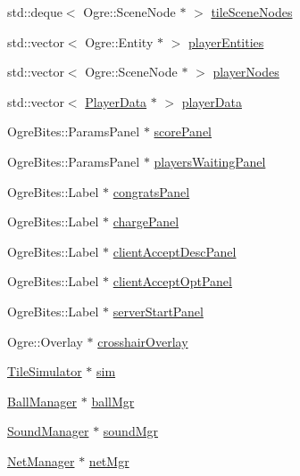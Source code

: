 \begin{DoxyCompactItemize}
\item 
std\-::deque$<$ Ogre\-::\-Scene\-Node $\ast$ $>$ \hyperlink{classTileGame_ac8b228c7849cb924a099f94de266c42d}{tile\-Scene\-Nodes}
\item 
std\-::vector$<$ Ogre\-::\-Entity $\ast$ $>$ \hyperlink{classTileGame_a30a9864bb733707d17c15b2c09a6245a}{player\-Entities}
\item 
std\-::vector$<$ Ogre\-::\-Scene\-Node $\ast$ $>$ \hyperlink{classTileGame_ab261f06fa3d89f8af2223ffe1a56337a}{player\-Nodes}
\item 
std\-::vector$<$ \hyperlink{structPlayerData}{Player\-Data} $\ast$ $>$ \hyperlink{classTileGame_adc02f822e33b2d8a77693301d050bb91}{player\-Data}
\item 
Ogre\-Bites\-::\-Params\-Panel $\ast$ \hyperlink{classTileGame_a9a4d1b4dfacca55fdeacf454af04fa0c}{score\-Panel}
\item 
Ogre\-Bites\-::\-Params\-Panel $\ast$ \hyperlink{classTileGame_a6ec622cd0062396ffa3e929702fc870d}{players\-Waiting\-Panel}
\item 
Ogre\-Bites\-::\-Label $\ast$ \hyperlink{classTileGame_a5e8deb9eb2903e1787a28699a9e6f346}{congrats\-Panel}
\item 
Ogre\-Bites\-::\-Label $\ast$ \hyperlink{classTileGame_ab63beac85c1df6056bd1a097e43cea34}{charge\-Panel}
\item 
Ogre\-Bites\-::\-Label $\ast$ \hyperlink{classTileGame_a0b1acda06716401a6a6a1936d111e187}{client\-Accept\-Desc\-Panel}
\item 
Ogre\-Bites\-::\-Label $\ast$ \hyperlink{classTileGame_ab768d0250251800d81ff2d85d1c2c324}{client\-Accept\-Opt\-Panel}
\item 
Ogre\-Bites\-::\-Label $\ast$ \hyperlink{classTileGame_a788abd4a926b8492ba5db8f4d87a41a7}{server\-Start\-Panel}
\item 
Ogre\-::\-Overlay $\ast$ \hyperlink{classTileGame_a11747d7250c1ef16b13a14a84edbfbaf}{crosshair\-Overlay}
\item 
\hyperlink{classTileSimulator}{Tile\-Simulator} $\ast$ \hyperlink{classTileGame_a2225cb84303358e59c6093b8a999e085}{sim}
\item 
\hyperlink{classBallManager}{Ball\-Manager} $\ast$ \hyperlink{classTileGame_a7fe1ce6963e7ac2bd5022e653368c0ed}{ball\-Mgr}
\item 
\hyperlink{classSoundManager}{Sound\-Manager} $\ast$ \hyperlink{classTileGame_aca4c76a09f77a7f55ae0c4396f72aefc}{sound\-Mgr}
\item 
\hyperlink{classNetManager}{Net\-Manager} $\ast$ \hyperlink{classTileGame_a691f85c8b3c30335e6b8f6f83a8910ad}{net\-Mgr}

\end{DoxyCompactItemize}
